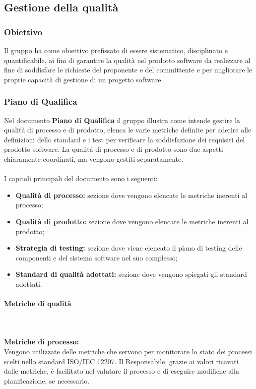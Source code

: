 \subsection{Gestione della qualità}
\subsubsection{Obiettivo}
Il gruppo \Gruppo ha come obiettivo prefissato di essere sistematico, disciplinato e quantificabile, ai fini di garantire la qualità nel prodotto software da realizzare al fine di soddisfare le richieste del proponente e del committente e per migliorare le proprie capacità di gestione di un progetto software.

\subsubsection{Piano di Qualifica}
Nel documento \textbf{Piano di Qualifica} il gruppo \Gruppo illustra come intende gestire la qualità di processo e di prodotto, elenca le varie metriche definite per aderire alle definizioni dello standard e i test per verificare la soddisfazione dei requisiti del prodotto software.
La qualità di processo e di prodotto sono due aspetti chiaramente coordinati, ma vengono gestiti separatamente. \\ \\
I capitoli principali del documento sono i seguenti:
\begin{itemize}
    \item \textbf{Qualità di processo:} sezione dove vengono elencate le metriche inerenti al processo;
    \item \textbf{Qualità di prodotto:} sezione dove vengono elencate le metriche inerenti al prodotto;
    \item \textbf{Strategia di testing:} sezione dove viene elencato il piano di testing delle componenti e del sistema software nel suo complesso;
    \item \textbf{Standard di qualità adottati:} sezione dove vengono spiegati gli standard adottati.
\end{itemize}

\paragraph{Metriche di qualità} \mbox{} \\ \\
\textbf{Metriche di processo:}\\
Vengono utilizzate delle metriche che servono per monitorare lo stato dei processi scelti nello standard ISO/IEC 12207. Il Responsabile, grazie ai valori ricavati dalle metriche, è facilitato nel
valutare il processo e di eseguire modifiche alla pianificazione, se necessario.\\

